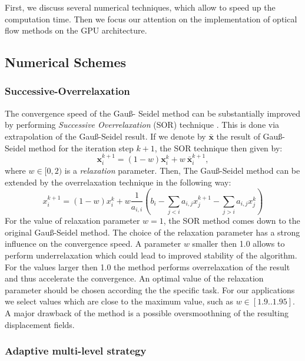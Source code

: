 First, we discuss several numerical techniques, which allow to speed up the computation time. Then we focus our attention on the implementation of optical flow methods on the GPU architecture.


\subsection{Numerical Schemes}
\label{advanced_numerics}

\subsubsection{Successive-Overrelaxation}
\label{sor_method}

The convergence speed of the Gau\ss - Seidel method can be substantially improved by performing \textit{Successive Overrelaxation} (SOR) technique \cite{Yo71, Saad03}. This is done via extrapolation of the Gau\ss-Seidel result. If we denote by $\bar{\textbf{x}}$ the result of Gau\ss - Seidel method for the iteration step $k+1$, the SOR technique then given by:
$$ \textbf{x}^{k+1}_i = (1-w) \textbf{x}^k_i + w \: \bar{\textbf{x}}^{k+1}_i ,$$
where $w \in [0,2)$ is a \textit{relaxation} parameter.  
Then, The Gau\ss-Seidel method can be extended by the overrelaxation technique in the following way:
$$ x^{k+1}_i = (1-w) x^k_i + w \frac{1}{a_{i,i}} (b_i - \sum_{j < i} a_{i,j} x^{k+1}_j - \sum_{j > i} a_{i,j} x^{k}_j) $$
For the value of relaxation parameter $w=1$, the SOR method comes down to the original Gau\ss-Seidel method. The choice of the relaxation parameter has a strong influence on the convergence speed. A parameter $w$ smaller then 1.0 allows to perform underrelaxation which could lead to improved stability of the algorithm. For the values larger then 1.0 the method performs overrelaxation of the result and thus accelerate the convergence. An optimal value of the relaxation parameter should be chosen according the the specific task. For our applications we select values which are close to the maximum value, such as $w \in [1.9..1.95]$.
A major drawback of the method is a possible oversmoothning of the resulting displacement fields. 


\subsubsection{Adaptive multi-level strategy}

